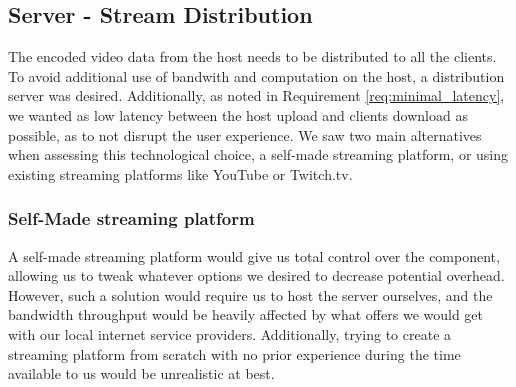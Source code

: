     
    
    
    
    
    
    
    
    
    
    
    
    
    
    

\subsection{Server - Stream Distribution} %
The encoded video data from the host needs to be distributed to all the clients. To avoid additional use of bandwith and computation on the host, a distribution server was desired. Additionally, as noted in Requirement \ref{req:minimal_latency}, we wanted as low latency between the host upload and clients download as possible, as to not disrupt the user experience. We saw two main alternatives when assessing this technological choice, a self-made streaming platform, or using existing streaming platforms like YouTube or Twitch.tv.

    
\subsubsection{Self-Made streaming platform}
A self-made streaming platform would give us total control over the component, allowing us to tweak whatever options we desired to decrease potential overhead. However, such a solution would require us to host the server ourselves, and the bandwidth throughput would be heavily affected by what offers we would get with our local internet service providers. Additionally, trying to create a streaming platform from scratch with no prior experience during the time available to us would be unrealistic at best. 


